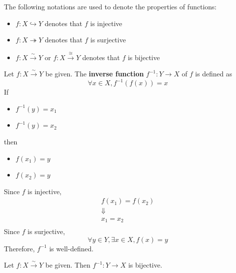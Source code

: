 \bigskip

\begin{remark}
    The following notations are used to denote the properties of functions:
    \begin{itemize}
        \item $f: X \hookrightarrow Y$ denotes that $f$ is injective
        \item $f: X \twoheadrightarrow Y$ denotes that $f$ is surjective
        \item $f: X \xrightarrow{\sim} Y$ or $f: X \xrightarrow{\cong} Y$ denotes that $f$ is bijective
    \end{itemize}
\end{remark}

\bigskip

\begin{definition} \label{an:def:inverse-function}
    Let $f: X \xrightarrow{\sim} Y$ be given. The \textbf{inverse function} $f^{-1}: Y \to X$ of $f$ is defined as
    \[
    \forall x \in X, f^{-1}(f(x)) = x
    \]
    If
    \begin{itemize}
        \item $f^{-1}(y) = x_{1}$
        \item $f^{-1}(y) = x_{2}$
    \end{itemize}
    then
    \begin{itemize}
        \item $f(x_{1}) = y$
        \item $f(x_{2}) = y$
    \end{itemize}
    Since $f$ is injective,
    \[
    \begin{array}{c}
        f(x_{1}) = f(x_{2}) \\
        \Downarrow \\
        x_{1} = x_{2} \\
    \end{array}
    \]
    Since $f$ is surjective,
    \[
    \forall y \in Y, \exists x \in X, f(x) = y
    \]
    Therefore, $f^{-1}$ is well-defined.
\end{definition}

\bigskip

\begin{theorem} \label{an:thm:inverse-function-is-bijective}
    Let $f: X \xrightarrow{\sim} Y$ be given. Then $f^{-1}: Y \to X$ is bijective.
\end{theorem}

